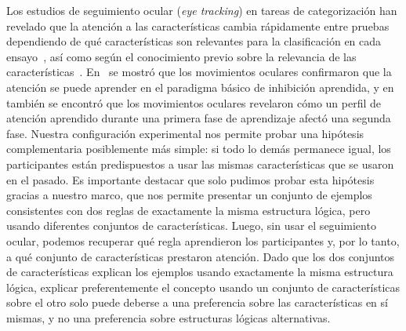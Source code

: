 Los estudios de seguimiento ocular ({\em eye tracking}) en tareas de categorización han revelado que la atención a las características cambia rápidamente entre pruebas dependiendo de qué características son relevantes para la clasificación en cada ensayo~\cite{blair2009extremely}, así como según el conocimiento previo sobre la relevancia de las características~\cite{kim2011prior}. En~\cite{kruschke2005eye} se mostró que los movimientos oculares confirmaron que la atención se puede aprender en el paradigma básico de inhibición aprendida, y en~\cite{hoffman2010costs} también se encontró que los movimientos oculares revelaron cómo un perfil de atención aprendido durante una primera fase de aprendizaje afectó una segunda fase. Nuestra configuración experimental nos permite probar una hipótesis complementaria posiblemente más simple: si todo lo demás permanece igual, los participantes están predispuestos a usar las mismas características que se usaron en el pasado. Es importante destacar que solo pudimos probar esta hipótesis gracias a nuestro marco, que nos permite presentar un conjunto de ejemplos consistentes con dos reglas de exactamente la misma estructura lógica, pero usando diferentes conjuntos de características. Luego, sin usar el seguimiento ocular, podemos recuperar qué regla aprendieron los participantes y, por lo tanto, a qué conjunto de características prestaron atención. Dado que los dos conjuntos de características explican los ejemplos usando exactamente la misma estructura lógica, explicar preferentemente el concepto usando un conjunto de características sobre el otro solo puede deberse a una preferencia sobre las características en sí mismas, y no una preferencia sobre estructuras lógicas alternativas.




